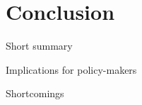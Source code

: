 \documentclass[12pt,a4paper]{article}
\begin{document}
\section{Conclusion}
Short summary

Implications for policy-makers

Shortcomings









\clearpage

\singlespacing



\end{document}
